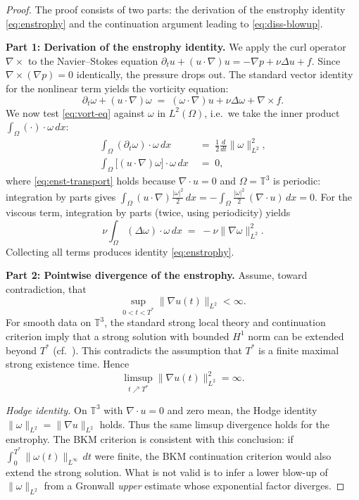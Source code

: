 \documentclass[12pt,a4paper]{article}
\theoremstyle{definition}
\theoremstyle{plain}
\theoremstyle{remark}
\begin{document}
\begin{proof}
The proof consists of two parts: the derivation of the enstrophy identity
\eqref{eq:enstrophy} and the continuation argument leading to
\eqref{eq:diss-blowup}.

\medskip
\noindent\textbf{Part 1: Derivation of the enstrophy identity.}
We apply the curl operator $\nabla\times$ to the Navier--Stokes equation
$\partial_t u + (u\cdot\nabla)u = -\nabla p + \nu\Delta u + f$.
Since $\nabla\times(\nabla p) = 0$ identically, the pressure drops out.
The standard vector identity for the nonlinear term yields the vorticity
equation:
\begin{equation}\label{eq:vort-eq}
    \partial_t \omega + (u\cdot\nabla)\omega
    \;=\; (\omega\cdot\nabla)u + \nu\Delta\omega + \nabla\times f.
\end{equation}
We now test \eqref{eq:vort-eq} against $\omega$ in $L^2(\Omega)$, i.e.\
we take the inner product $\int_\Omega (\cdot)\cdot\omega\,dx$:
\begin{align}
    \int_\Omega (\partial_t\omega)\cdot\omega\,dx
    &\;=\; \frac{1}{2}\frac{d}{dt}\|\omega\|_{L^2}^2, \label{eq:enst-lhs}\\[4pt]
    \int_\Omega \bigl[(u\cdot\nabla)\omega\bigr]\cdot\omega\,dx
    &\;=\; 0,\label{eq:enst-transport}
\end{align}
where \eqref{eq:enst-transport} holds because $\nabla\cdot u = 0$ and
$\Omega = \mathbb{T}^3$ is periodic: integration by parts gives
$\int_\Omega (u\cdot\nabla)\tfrac{|\omega|^2}{2}\,dx
= -\int_\Omega \tfrac{|\omega|^2}{2}\,(\nabla\cdot u)\,dx = 0$.
For the viscous term, integration by parts (twice, using periodicity) yields
\[
    \nu\int_\Omega (\Delta\omega)\cdot\omega\,dx
    \;=\; -\nu\|\nabla\omega\|_{L^2}^2.
\]
Collecting all terms produces identity \eqref{eq:enstrophy}.

\medskip
\noindent\textbf{Part 2: Pointwise divergence of the enstrophy.}
Assume, toward contradiction, that
\[
    \sup_{0<t<T^*}\|\nabla u(t)\|_{L^2} < \infty.
\]
For smooth data on $\mathbb{T}^3$, the standard strong local theory and
continuation criterion imply that a strong solution with bounded $H^1$ norm
can be extended beyond $T^*$ (cf.\ \cite{ConstantinFoias1988}).  This
contradicts the assumption that $T^*$ is a finite maximal strong existence
time.  Hence
\[
    \limsup_{t\nearrow T^*}\|\nabla u(t)\|_{L^2}^2 = \infty.
\]

\smallskip
\noindent\emph{Hodge identity.}
On $\mathbb{T}^3$ with $\nabla\cdot u = 0$ and zero mean, the Hodge identity
$\|\omega\|_{L^2} = \|\nabla u\|_{L^2}$ holds.
Thus the same limsup divergence holds for the enstrophy.  The BKM criterion is
consistent with this conclusion: if
$\int_0^{T^*}\|\omega(t)\|_{L^\infty}\,dt$ were finite, the BKM continuation
criterion would also extend the strong solution.  What is not valid is to
infer a lower blow-up of $\|\omega\|_{L^2}$ from a Gronwall \emph{upper}
estimate whose exponential factor diverges.


\end{proof}
\end{document}
